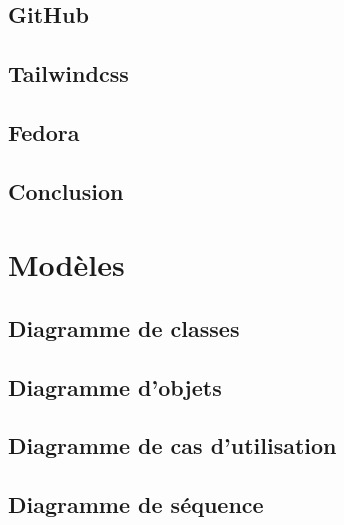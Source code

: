     \subsection{GitHub}\label{subsec: conception-github}
    

    \subsection{Tailwindcss}\label{subsec: conception-tailwind}
    

    \subsection{Fedora}\label{subsec: conception-fedora}
    

    \subsection*{Conclusion}\label{subsec: conception-conclusion-choix-techniques}
    

    \section{Modèles}\label{sec: conception-database-models}
    \subsection{Diagramme de classes}\label{subsec:conception-class-diagram}
    

    \subsection{Diagramme d'objets}\label{subsec:conception-object-diagram}
    

    \subsection{Diagramme de cas d'utilisation}\label{subsec:conception-use-case-diagram}
    

    \subsection{Diagramme de séquence}\label{subsec:conception-sequence-diagram}
    